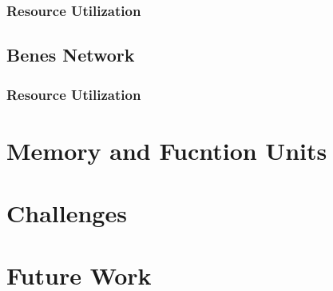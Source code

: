 \documentclass{beamer}
\begin{document}
	\subsubsection{Resource Utilization}
	  
      
	\subsection{Benes Network}
		
		
		\subsubsection{Resource Utilization}
			

\section{Memory and Fucntion Units}
  
  
\section{Challenges}
  
  
\section{Future Work}
  
  
\end{document}
